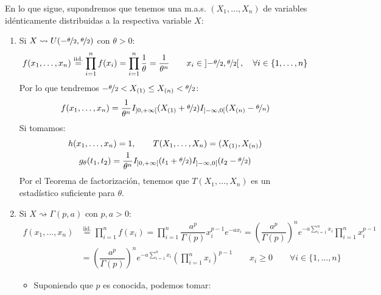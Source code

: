 \begin{ejercicio}
    \noindent
    En lo que sigue, supondremos que tenemos una m.a.s. $(X_1, \ldots, X_n)$ de variables idénticamente distribuidas a la respectiva variable $X$:
    \begin{enumerate}[label=\alph*)]
        \item Si $X\rightsquigarrow U(-\nicefrac{\theta}{2},\nicefrac{\theta}{2})$ con $\theta>0$:
            \begin{equation*}
                f(x_1, \ldots, x_n) \stackrel{\text{iid.}}{=}\prod_{i=1}^{n}f(x_i) = \prod_{i=1}^{n} \dfrac{1}{\theta} = \dfrac{1}{\theta^n} \qquad x_i \in \left]-\nicefrac{\theta}{2},\nicefrac{\theta}{2}\right[, \quad \forall i \in \{1,\ldots,n\}
            \end{equation*}
            Por lo que tendremos $-\nicefrac{\theta}{2}<X_{(1)}\leq X_{(n)} < \nicefrac{\theta}{2}$:
            \begin{equation*}
                f(x_1, \ldots, x_n) = \dfrac{1}{\theta^n} I_{\left]0,+\infty\right[}(X_{(1)}+\nicefrac{\theta}{2}) I_{\left]-\infty,0\right[}(X_{(n)}-\nicefrac{\theta}{n})
            \end{equation*}
            Si tomamos:
            \begin{gather*}
                h(x_1,\ldots,x_n)=1,\qquad T(X_1, \ldots, X_n) = (X_{(1)}, X_{(n)}) \\ g_{\theta}(t_1,t_2) = \dfrac{1}{\theta^n} I_{\left]0,+\infty\right[}(t_1 + \nicefrac{\theta}{2}) I_{\left]-\infty,0\right[}(t_2-\nicefrac{\theta}{2})
            \end{gather*}
            Por el Teorema de factorización, tenemos que $T(X_1, \ldots, X_n)$ es un estadístico suficiente para $\theta$.
        \item Si $X\rightsquigarrow\Gamma(p,a)$ con $p,a>0$:
            \begin{align*}
                f(x_1, \ldots, x_n) &\stackrel{\text{iid.}}{=} \prod_{i=1}^{n}f(x_i) = \prod_{i=1}^{n} \dfrac{a^p}{\Gamma(p)} x_i^{p-1} e^{-ax_i} = {\left(\dfrac{a^p}{\Gamma(p)}\right)}^{n} e^{-a\sum\limits_{i=1}^{n}x_i} \prod_{i=1}^{n}x_i^{p-1} \\ 
                                    &= {\left(\dfrac{a^p}{\Gamma(p)}\right)}^{n} e^{-a\sum\limits_{i=1}^{n}x_i} {\left(\prod_{i=1}^{n}x_i\right)}^{p-1} \qquad x_i \geq 0 \qquad \forall i \in \{1,\ldots,n\}
            \end{align*}
            \begin{itemize}
                \item Suponiendo que $p$ es conocida, podemos tomar:

\end{itemize}
\end{enumerate}
\end{ejercicio}
